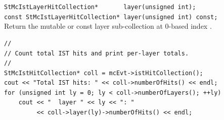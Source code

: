 \begin{Entry}
    \verb+StMcIstLayerHitCollection*       layer(unsigned int);+\\
    \verb+const StMcIstLayerHitCollection* layer(unsigned int) const;+\\
    Return the mutable or const layer sub-collection at 0-based index
    .

\item[Examples]
{\footnotesize
\begin{verbatim}
//
// Count total IST hits and print per-layer totals.
//
StMcIstHitCollection* coll = mcEvt->istHitCollection();
cout << "Total IST hits: " << coll->numberOfHits() << endl;
for (unsigned int ly = 0; ly < coll->numberOfLayers(); ++ly)
    cout << "  layer " << ly << ": "
         << coll->layer(ly)->numberOfHits() << endl;
\end{verbatim}
}%
\end{Entry}
\clearpage

%
%
